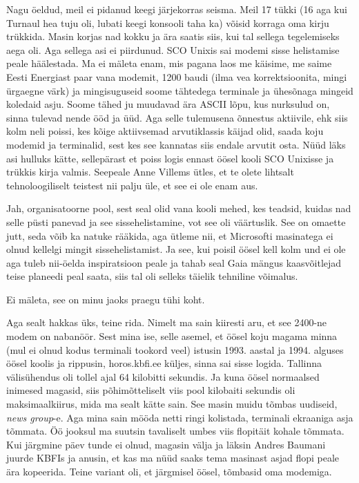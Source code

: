 Nagu öeldud, meil ei pidanud keegi järjekorras seisma. Meil 17 tükki (16 aga kui Turnaul hea tuju oli, lubati keegi konsooli taha ka) võisid korraga oma kirju trükkida. Masin korjas nad kokku ja ära saatis siis, kui tal sellega tegelemiseks aega oli. Aga sellega asi ei piirdunud. SCO Unixis sai modemi sisse helistamise peale häälestada. Ma ei mäleta enam, mis pagana laos me käisime, me saime Eesti Energiast paar vana modemit, 1200 baudi (ilma vea korrektsioonita, mingi ürgaegne värk) ja mingisuguseid soome tähtedega terminale ja ühesõnaga mingeid koledaid asju. Soome tähed ju muudavad ära ASCII lõpu, kus nurksulud on, sinna tulevad nende ööd ja üüd. Aga selle tulemusena õnnestus aktiivile, ehk siis kolm neli poissi, kes kõige aktiivsemad arvutiklassis käijad olid, saada koju modemid ja terminalid, sest kes see kannatas siis endale arvutit osta. Nüüd läks asi hulluks kätte, sellepärast et poiss logis ennast öösel kooli SCO Unixisse ja trükkis kirja valmis.  Seepeale Anne Villems ütles, et te olete lihtsalt tehnoloogiliselt teistest nii palju üle, et see ei ole enam aus. 


Jah, organisatoorne pool, sest seal olid vana kooli mehed, kes teadsid, kuidas nad selle püsti panevad ja see sissehelistamine, vot see oli väärtuslik. See on omaette jutt, seda võib ka natuke rääkida, aga ütleme nii, et  Microsofti masinatega ei olnud kellelgi mingit sissehelistamist. Ja see, kui poisil öösel kell kolm und ei ole aga tuleb nii-öelda  inspiratsioon peale ja tahab seal Gaia mängus kaasvõitlejad teise planeedi peal saata, siis tal oli selleks täielik tehniline võimalus. 


Ei mäleta, see on minu jaoks praegu tühi koht. 

Aga sealt hakkas üks, teine rida. Nimelt ma sain kiiresti aru, et see 2400-ne  modem on nabanöör. Sest mina ise, selle asemel, et öösel koju magama minna (mul ei olnud kodus terminali tookord veel)  istusin 1993. aastal ja  1994. alguses öösel koolis ja rippusin, horos.kbfi.ee küljes, sinna sai sisse logida. Tallinna välisühendus oli tollel ajal 64 kilobitti sekundis. Ja kuna öösel normaalsed inimesed magasid, siis põhimõtteliselt viis pool kilobaiti sekundis oli maksimaalkiirus, mida ma sealt kätte sain. See masin muidu tõmbas uudiseid, \emph{news group}-e. Aga mina sain mööda netti ringi kolistada,  terminali ekraaniga asja tõmmata. Öö jooksul ma suutsin tavaliselt umbes viis flopitäit kohale tõmmata. Kui  järgmine päev tunde ei olnud, magasin välja ja läksin Andres Baumani juurde KBFIs ja anusin, et kas ma nüüd saaks tema masinast asjad flopi peale ära kopeerida. Teine variant oli, et järgmisel öösel, tõmbasid oma modemiga. 

